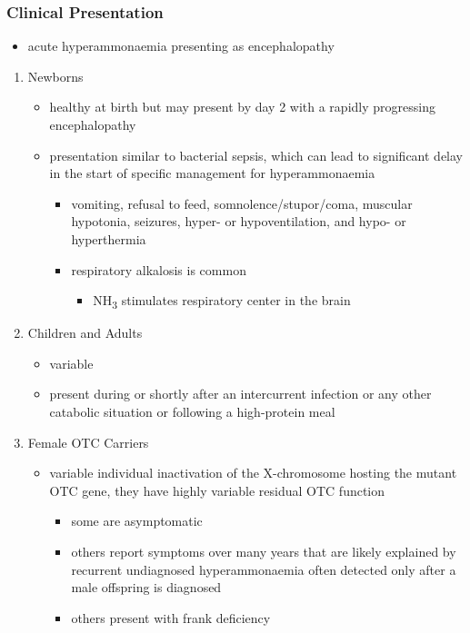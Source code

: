 \documentclass{scrartcl}
\begin{document}
\subsubsection{Clinical Presentation}
\label{sec:org13c75ba}
\begin{itemize}
\item acute hyperammonaemia presenting as encephalopathy
\end{itemize}
\begin{enumerate}
\item Newborns
\label{sec:orgd15a2f1}
\begin{itemize}
\item healthy at birth but may present by day 2 with a rapidly
progressing encephalopathy
\item presentation similar to bacterial sepsis, which can lead to
significant delay in the start of specific management for
hyperammonaemia
\begin{itemize}
\item vomiting, refusal to feed, somnolence/stupor/coma, muscular
hypotonia, seizures, hyper- or hypoventilation, and hypo- or
hyperthermia
\item respiratory alkalosis is common
\begin{itemize}
\item NH\textsubscript{3} stimulates respiratory center in the brain
\end{itemize}
\end{itemize}
\end{itemize}

\item Children and Adults
\label{sec:org63582ab}
\begin{itemize}
\item variable
\item present during or shortly after an intercurrent infection or any
other catabolic situation or following a high-protein meal
\end{itemize}

\item Female OTC Carriers
\label{sec:orgad436be}
\begin{itemize}
\item variable individual inactivation of the X-chromosome hosting the
mutant OTC gene, they have highly variable residual OTC function
\begin{itemize}
\item some are asymptomatic
\item others report symptoms over many years that are likely explained
by recurrent undiagnosed hyperammonaemia often detected only after
a male offspring is diagnosed
\item others present with frank deficiency
\end{itemize}
\end{itemize}
\end{enumerate}
\end{document}
